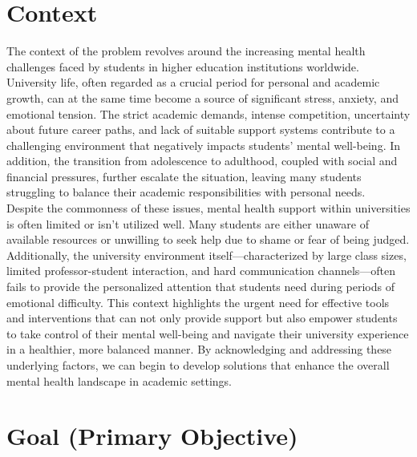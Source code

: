 \section{Context}

The context of the problem revolves around the increasing mental health challenges faced by students in higher education institutions worldwide. University life, often regarded as a crucial period for personal and academic growth, can at the same time become a source of significant stress, anxiety, and emotional tension. The strict academic demands, intense competition, uncertainty about future career paths, and lack of suitable support systems contribute to a challenging environment that negatively impacts students' mental well-being. In addition, the transition from adolescence to adulthood, coupled with social and financial pressures, further escalate the situation, leaving many students struggling to balance their academic responsibilities with personal needs.\vspace{5mm} \\
Despite the commonness of these issues, mental health support within universities is often limited or isn't utilized well. Many students are either unaware of available resources or unwilling to seek help due to shame or fear of being judged. Additionally, the university environment itself—characterized by large class sizes, limited professor-student interaction, and hard communication channels—often fails to provide the personalized attention that students need during periods of emotional difficulty. This context highlights the urgent need for effective tools and interventions that can not only provide support but also empower students to take control of their mental well-being and navigate their university experience in a healthier, more balanced manner. By acknowledging and addressing these underlying factors, we can begin to develop solutions that enhance the overall mental health landscape in academic settings.

\section{Goal (Primary Objective)}

